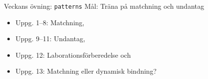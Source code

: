 



\begin{Slide}{Veckans övning: \texttt{patterns}}
  Mål: Träna på matchning och undantag
\begin{itemize}
\item Uppg. 1--8: Matchning, 
\item Uppg. 9--11: Undantag, 
\item Uppg. 12: Laborationsförberedelse  och 
\item Uppg. 13: Matchning eller dynamisk bindning?
\end{itemize}
\end{Slide}


